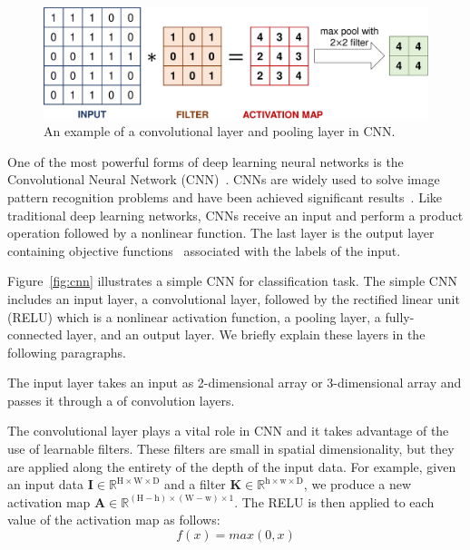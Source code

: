 \begin{figure}[t!]
	\center
	\includegraphics[scale=0.3]{figs/filter_pooling.pdf}
	\caption{An example of a convolutional layer and pooling layer in CNN.}
	\label{fig:filter}
\end{figure}

One of the most powerful forms of deep learning neural networks is the Convolutional Neural Network (CNN)~\cite{lecun2015deep}. CNNs are widely used to solve image pattern recognition problems and have been achieved significant results~\cite{karpathy2014large, lawrence1997face, krizhevsky2012imagenet}. Like traditional deep learning networks, CNNs receive an input and perform a product operation followed by a nonlinear function. The last layer is the output layer containing objective functions~\cite{zhao2017loss} associated with the labels of the input.

Figure~\ref{fig:cnn} illustrates a simple CNN for classification task. The simple CNN includes an input layer, a convolutional layer, followed by the rectified linear unit (RELU) which is a nonlinear activation function, a pooling layer, a fully-connected layer, and an output layer. We briefly explain these layers in the following paragraphs. 

The input layer takes an input as 2-dimensional array or 3-dimensional array and passes it through a of convolution layers.

The convolutional layer plays a vital role in CNN and it takes advantage of the use of learnable filters. These filters are small in spatial dimensionality, but they are applied along the entirety of the depth of the input data. For example, given an input data $\textbf{I} \in \mathbb{R}^{\text{H} \times \text{W} \times \text{D}}$ and a filter $\textbf{K} \in \mathbb{R}^{\text{h} \times \text{w} \times \text{D}}$, we produce a new activation map $\textbf{A} \in \mathbb{R}^{(\text{H} - \text{h}) \times (\text{W} - \text{w}) \times 1}$. The RELU is then applied to each value of the activation map as follows:
\begin{equation}
\label{eq:relu}
f(x) = max(0, x)   
\end{equation}


